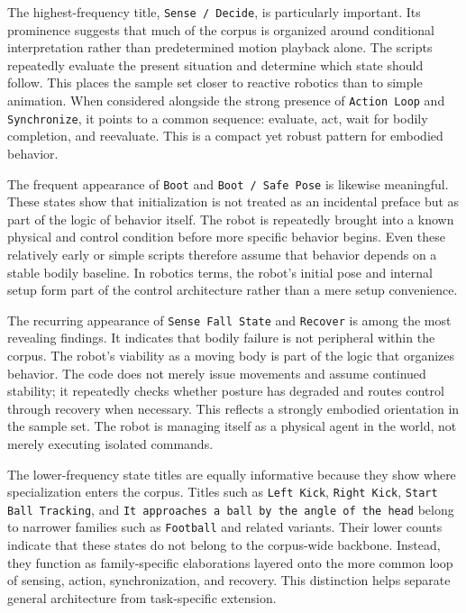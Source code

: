 \documentclass[11pt]{article}
\begin{document}
The highest-frequency title, \texttt{Sense / Decide}, is particularly
important. Its prominence suggests that much of the corpus is organized
around conditional interpretation rather than predetermined motion
playback alone. The scripts repeatedly evaluate the present situation
and determine which state should follow. This places the sample set
closer to reactive robotics than to simple animation. When considered
alongside the strong presence of \texttt{Action Loop} and
\texttt{Synchronize}, it points to a common sequence: evaluate, act,
wait for bodily completion, and reevaluate. This is a compact yet
robust pattern for embodied behavior.

The frequent appearance of \texttt{Boot} and \texttt{Boot / Safe Pose}
is likewise meaningful. These states show that initialization is not
treated as an incidental preface but as part of the logic of behavior
itself. The robot is repeatedly brought into a known physical and
control condition before more specific behavior begins. Even these
relatively early or simple scripts therefore assume that behavior
depends on a stable bodily baseline. In robotics terms, the robot's
initial pose and internal setup form part of the control architecture
rather than a mere setup convenience.

The recurring appearance of \texttt{Sense Fall State} and
\texttt{Recover} is among the most revealing findings. It indicates
that bodily failure is not peripheral within the corpus. The robot's
viability as a moving body is part of the logic that organizes
behavior. The code does not merely issue movements and assume continued
stability; it repeatedly checks whether posture has degraded and routes
control through recovery when necessary. This reflects a strongly
embodied orientation in the sample set. The robot is managing itself as
a physical agent in the world, not merely executing isolated commands.

The lower-frequency state titles are equally informative because they
show where specialization enters the corpus. Titles such as
\texttt{Left Kick}, \texttt{Right Kick}, \texttt{Start Ball Tracking},
and \texttt{It approaches a ball by the angle of the head} belong to
narrower families such as \texttt{Football} and related variants. Their
lower counts indicate that these states do not belong to the
corpus-wide backbone. Instead, they function as family-specific
elaborations layered onto the more common loop of sensing, action,
synchronization, and recovery. This distinction helps separate general
architecture from task-specific extension.
\end{document}
